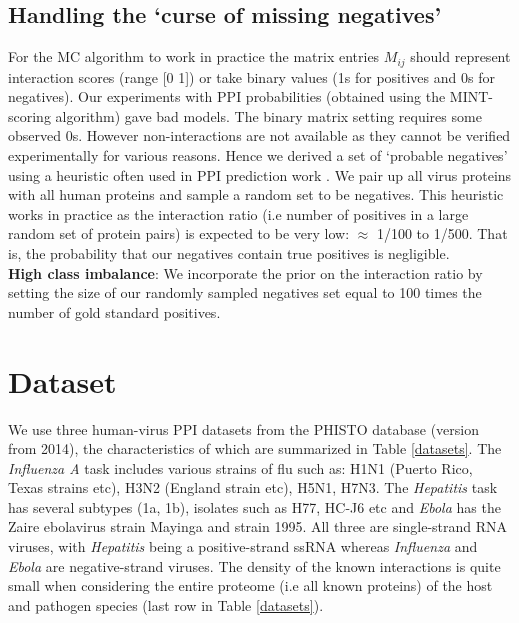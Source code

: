 \documentclass{bioinfo}
\begin{document}
\subsection{Handling the `curse of missing negatives'}
\label{negs}
For the MC algorithm to work in practice the matrix entries $M_{ij}$ should represent interaction scores (range [0 1]) 
or take binary values (1s for positives and 0s for negatives). Our experiments with PPI probabilities (obtained using the MINT-scoring algorithm)
gave bad models. The binary matrix setting requires some observed 0s. However non-interactions are not available as they cannot be verified 
experimentally for various reasons. Hence we derived a set of `probable negatives' using a heuristic often used in PPI prediction 
work \citep{qi06,qi09,dyer11,me_ismb_2013}. We pair up all virus proteins with all human proteins and sample a random set to be negatives. 
This heuristic works in practice as the interaction ratio (i.e number of positives in a large random set of protein pairs) is expected to be very low:
$\approx$ 1/100 to 1/500. That is, the probability that our negatives contain true positives is negligible. \\
\textbf{High class imbalance}: We incorporate the prior on the interaction ratio by setting the size of our randomly sampled negatives set equal to
100 times the number of gold standard positives.



\section{Dataset}
\label{sec:datasets}
We use three human-virus PPI datasets from the PHISTO \citep{phisto} database (version from 2014), the characteristics of which are summarized in Table \ref{datasets}. 
The \textit{Influenza A} task includes various strains of flu such as: H1N1 (Puerto Rico, Texas strains etc), H3N2 (England strain etc), H5N1, H7N3.
The \textit{Hepatitis} task has several subtypes (1a, 1b), isolates such as H77, HC-J6 etc and \textit{Ebola} has the Zaire ebolavirus strain Mayinga and strain 1995.
All three are single-strand RNA viruses, with \textit{Hepatitis} being a positive-strand ssRNA whereas \textit{Influenza} and \textit{Ebola} are negative-strand viruses. The density of the known interactions is quite small when considering the entire proteome (i.e all known proteins) of the host and pathogen species (last row in Table \ref{datasets}). \\
\end{document}
